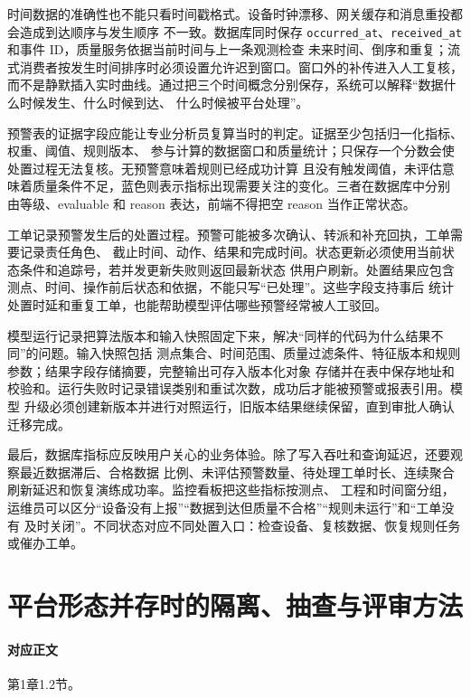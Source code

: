 时间数据的准确性也不能只看时间戳格式。设备时钟漂移、网关缓存和消息重投都会造成到达顺序与发生顺序
不一致。数据库同时保存 \texttt{occurred\_at}、\texttt{received\_at} 和事件 ID，质量服务依据当前时间与上一条观测检查
未来时间、倒序和重复；流式消费者按发生时间排序时必须设置允许迟到窗口。窗口外的补传进入人工复核，
而不是静默插入实时曲线。通过把三个时间概念分别保存，系统可以解释“数据什么时候发生、什么时候到达、
什么时候被平台处理”。

预警表的证据字段应能让专业分析员复算当时的判定。证据至少包括归一化指标、权重、阈值、规则版本、
参与计算的数据窗口和质量统计；只保存一个分数会使处置过程无法复核。无预警意味着规则已经成功计算
且没有触发阈值，未评估意味着质量条件不足，蓝色则表示指标出现需要关注的变化。三者在数据库中分别
由等级、evaluable 和 reason 表达，前端不得把空 reason 当作正常状态。

工单记录预警发生后的处置过程。预警可能被多次确认、转派和补充回执，工单需要记录责任角色、
截止时间、动作、结果和完成时间。状态更新必须使用当前状态条件和追踪号，若并发更新失败则返回最新状态
供用户刷新。处置结果应包含测点、时间、操作前后状态和依据，不能只写“已处理”。这些字段支持事后
统计处置时延和重复工单，也能帮助模型评估哪些预警经常被人工驳回。

模型运行记录把算法版本和输入快照固定下来，解决“同样的代码为什么结果不同”的问题。输入快照包括
测点集合、时间范围、质量过滤条件、特征版本和规则参数；结果字段存储摘要，完整输出可存入版本化对象
存储并在表中保存地址和校验和。运行失败时记录错误类别和重试次数，成功后才能被预警或报表引用。模型
升级必须创建新版本并进行对照运行，旧版本结果继续保留，直到审批人确认迁移完成。

最后，数据库指标应反映用户关心的业务体验。除了写入吞吐和查询延迟，还要观察最近数据滞后、合格数据
比例、未评估预警数量、待处理工单时长、连续聚合刷新延迟和恢复演练成功率。监控看板把这些指标按测点、
工程和时间窗分组，运维员可以区分“设备没有上报”“数据到达但质量不合格”“规则未运行”和“工单没有
及时关闭”。不同状态对应不同处置入口：检查设备、复核数据、恢复规则任务或催办工单。

\section{平台形态并存时的隔离、抽查与评审方法}\label{app:ext-ch01-platform-review}\label{online:ch01}

\paragraph{对应正文}第1章1.2节。

